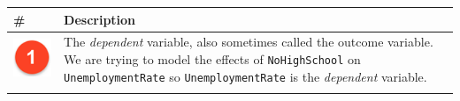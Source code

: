 \documentclass[]{article}
\begin{document}
\begin{longtable}[]{@{}ll@{}}
\toprule
\begin{minipage}[b]{0.07\columnwidth}\raggedright
\#\strut
\end{minipage} & \begin{minipage}[b]{0.87\columnwidth}\raggedright
Description\strut
\end{minipage}\tabularnewline
\midrule
\endhead
\begin{minipage}[t]{0.07\columnwidth}\raggedright
\includegraphics[width=1\textwidth,height=\textheight]{./img/circle1.png}\strut
\end{minipage} & \begin{minipage}[t]{0.87\columnwidth}\raggedright
The \emph{dependent} variable, also sometimes called the outcome variable. We are trying to model the effects of \texttt{NoHighSchool} on \texttt{UnemploymentRate} so \texttt{UnemploymentRate} is the \emph{dependent} variable.\strut
\end{minipage}\tabularnewline
\begin{minipage}[t]{0.07\columnwidth}\raggedright

\end{minipage}
\end{longtable}
\end{document}
